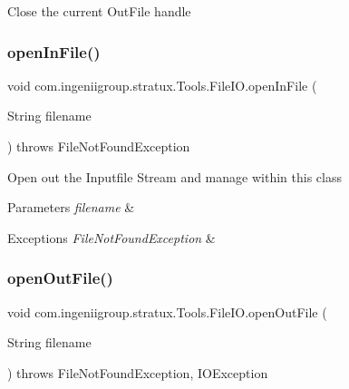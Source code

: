 Close the current Out\+File handle \mbox{\label{classcom_1_1ingeniigroup_1_1stratux_1_1_tools_1_1_file_i_o_ac70a76488327d17823938bb9f0cb4583}} 
\subsubsection{\texorpdfstring{open\+In\+File()}{openInFile()}}
{\footnotesize\ttfamily void com.\+ingeniigroup.\+stratux.\+Tools.\+File\+I\+O.\+open\+In\+File (\begin{DoxyParamCaption}\item[{String}]{filename }\end{DoxyParamCaption}) throws File\+Not\+Found\+Exception}

Open out the Inputfile Stream and manage within this class


\begin{DoxyParams}{Parameters}
{\em filename} & \\
\hline
\end{DoxyParams}

\begin{DoxyExceptions}{Exceptions}
{\em File\+Not\+Found\+Exception} & \\
\hline
\end{DoxyExceptions}
\mbox{\label{classcom_1_1ingeniigroup_1_1stratux_1_1_tools_1_1_file_i_o_a73b85b9a6da4e8a7dbf2d0fb90ce26f6}} 
\subsubsection{\texorpdfstring{open\+Out\+File()}{openOutFile()}}
{\footnotesize\ttfamily void com.\+ingeniigroup.\+stratux.\+Tools.\+File\+I\+O.\+open\+Out\+File (\begin{DoxyParamCaption}\item[{String}]{filename }\end{DoxyParamCaption}) throws File\+Not\+Found\+Exception, I\+O\+Exception}

